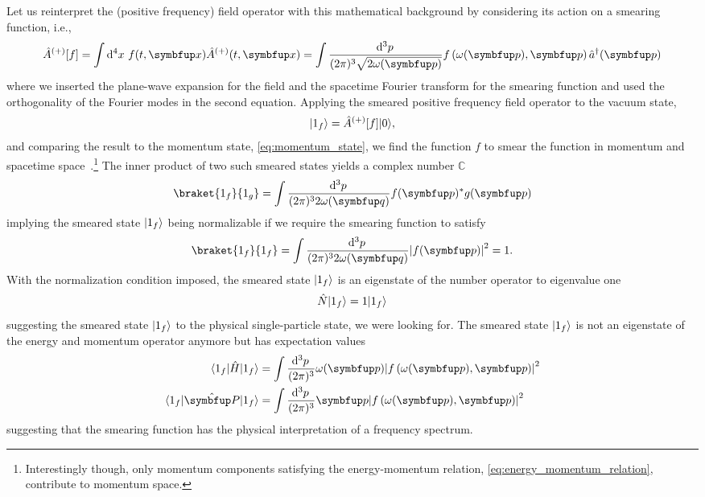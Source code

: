 Let us reinterpret the (positive frequency) field operator with this mathematical background by considering its action on a smearing function, i.e.,
\begin{equation}
	\hat{A}^{(+)}[f]
	=
	\int\dd[4]{x}
	f(t,\vb{x})
	\hat{A}^{(+)}(t,\vb{x})
	=
	\int\frac{\dd[3]{p}}{(2\pi)^3\sqrt{2\omega(\vb{p})}}
	f\left(\omega(\vb{p}),\vb{p}\right)
	\hat{a}^\dagger(\vb{p})
\end{equation}
where we inserted the plane-wave expansion for the field and the spacetime Fourier transform for the smearing function and used the orthogonality of the Fourier modes in the second equation.
Applying the smeared positive frequency field operator to the vacuum state,
\begin{equation}
	\begin{split}
		\lvert1_f\rangle
		=
		\hat{A}^{(+)}[f]
		\lvert0\rangle
		,
	\end{split}
	\label{eq:single_particle_state}
\end{equation}
and comparing the result to the momentum state, \cref{eq:momentum_state}, we find the function $f$ to smear the function in momentum and spacetime space~\cite[p.~35]{Srednicki2007}.\footnote{Interestingly though, only momentum components satisfying the energy-momentum relation, \cref{eq:energy_momentum_relation}, contribute to momentum space.}
The inner product of two such smeared states yields a complex number $\mathbb{C}$
\begin{equation}
	\braket{1_f}{1_g}
	=
	\int\frac{\dd[3]{p}}{(2\pi)^32\omega(\vb{q})}
	f(\vb{p})^*
	g(\vb{p})
\end{equation}
implying the smeared state $\lvert1_f\rangle$ being normalizable if we require the smearing function to satisfy
\begin{equation}
	\braket{1_f}{1_f}
	=
	\int\frac{\dd[3]{p}}{(2\pi)^32\omega(\vb{q})}
	\abs*{f(\vb{p})}^2
	=
	1
	\label{eq:spectrum_normalization}
	.
\end{equation}
With the normalization condition imposed, the smeared state $\lvert1_f\rangle$ is an eigenstate of the number operator to eigenvalue one
\begin{equation}
	\hat{N}
	\lvert1_f\rangle
	=
	1
	\lvert1_f\rangle
\end{equation}
suggesting the smeared state $\lvert1_f\rangle$ to the physical single-particle state, we were looking for.
The smeared state $\lvert1_f\rangle$ is not an eigenstate of the energy and momentum operator anymore but has expectation values
\begin{align}
	\bra{1_f}
	\hat{H}
	\ket{1_f}
	&=
	\int\frac{\dd[3]{p}}{(2\pi)^3}
	\omega(\vb{p})
	\abs*{f\left(\omega(\vb{p}),\vb{p}\right)}^2
	\\
	\bra{1_f}
	\vu{P}
	\ket{1_f}
	&=
	\int\frac{\dd[3]{p}}{(2\pi)^3}
	\vb{p}
	\abs*{f\left(\omega(\vb{p}),\vb{p}\right)}^2
\end{align}
suggesting that the smearing function has the physical interpretation of a frequency spectrum.


